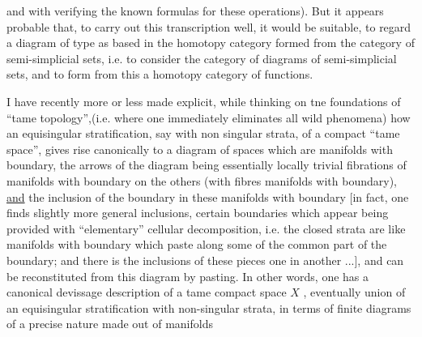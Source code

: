 
and with verifying the known formulas for these operations).
But it appears probable that, to carry out this transcription well,
it would be suitable, to regard a diagram of type
\diagram{\begin{tikzcd}
  \cdot \ar[r]\ar[d] & {} \\
  {} &
\end{tikzcd}}
as based in the homotopy category formed from the category of
semi-simplicial sets, i.e. to consider the category of diagrams
of semi-simplicial sets, and to form from this a homotopy category
of functions.

I have recently more or less made explicit, while thinking
on tne foundations of ``tame topology'',(i.e. where one immediately
eliminates all wild phenomena) how an equisingular stratification,
say with non singular strata, of a compact ``tame  space'', gives
rise canonically to a diagram of spaces which are manifolds with
boundary, the arrows of the diagram being essentially locally
trivial fibrations of manifolds with boundary on the others (with
fibres manifolds with boundary), \uline{and} the inclusion of the boundary
in these manifolds with boundary [in fact, one finds slightly
more general inclusions, certain boundaries which appear being
provided with ``elementary'' cellular decomposition, i.e. the
closed strata are like manifolds with boundary which paste along
some of the common part of the boundary; and there is
\hspace*{20em} the inclusions of these pieces
one in another ...], and can be reconstituted from this diagram
by pasting.  In other words, one has a canonical devissage
description of a tame compact space  $X$ , eventually union of an
equisingular stratification with non-singular strata, in terms
of finite diagrams of a precise nature made out of manifolds

